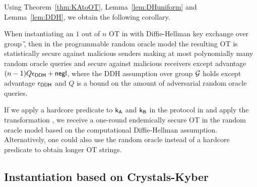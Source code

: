 Using Theorem~\ref{thm:KAtoOT}, Lemma~\ref{lem:DHuniform} and Lemma~\ref{lem:DDH}, we obtain the following corollary.

\begin{corollary}
When instantiating an $1$ out of $n$ OT in  with Diffie-Hellman key exchange over group \G, then in the programmable random oracle model the resulting OT is statistically secure against malicious senders making at most polynomially many random oracle queries and secure against malicious receivers except advantage $(n-1)Q\epsilon_{\mathsf{DDH}}+\mathsf{negl}$, where the DDH assumption over group $\mathcal{G}$ holds except advantage $\epsilon_{\mathsf{DDH}}$ and $Q$ is a bound on the amount of adversarial random oracle queries.
\end{corollary}

\begin{remark}
If we apply a hardcore predicate to $\mathsf{k}_{\mathsf{A}}$ and $\mathsf{k}_{\mathsf{B}}$ in the protocol in  and apply the transformation , we receive a one-round endemically secure OT in the random oracle model based on the computational Diffie-Hellman assumption. Alternatively, one could also use the random oracle instead of a hardcore predicate to obtain longer OT strings. 
\end{remark}

\subsection{Instantiation based on Crystals-Kyber}
\newcommand{\sk}{\ensuremath{\mathsf{sk}}\xspace}
\newcommand{\pk}{\ensuremath{\mathsf{pk}}\xspace}
\newcommand{\kyberc}{\ensuremath{\mathsf{c}}\xspace}
\newcommand{\kybergen}{\ensuremath{\mathsf{Kyber.KeyGen}}\xspace}
\newcommand{\kyberenc}{\ensuremath{\mathsf{Kyber.Enc}}\xspace}
\newcommand{\kyberdec}{\ensuremath{\mathsf{Kyber.Dec}}\xspace}
\newcommand{\kB}{\ensuremath{\mathcal{B}}\xspace}
\newcommand{\kenc}{\ensuremath{\mathsf{Encode}}\xspace}
\newcommand{\kdec}{\ensuremath{\mathsf{Decode}}\xspace}
\newcommand{\kcom}{\ensuremath{\mathsf{Compress}}\xspace}
\newcommand{\kdecom}{\ensuremath{\mathsf{Decompress}}\xspace}
\newcommand{\kparse}{\ensuremath{\mathsf{Parse}}\xspace}
\newcommand{\R}{\ensuremath{\mathcal R}\xspace}
\newcommand{\LWE}{\ensuremath{\mathsf{LWE}}\xspace}
\newcommand{\MLWE}{\ensuremath{\mathsf{MLWE}}\xspace}
\newcommand{\mt}{\ensuremath{{\mathbf t}}\xspace}
\newcommand{\cdt}{\ensuremath{\tilde{\mt}}\xspace}
\newcommand{\kLWE}{\ensuremath{k_{\LWE}}\xspace}
\newcommand{\nLWE}{\ensuremath{n_{\LWE}}\xspace}

